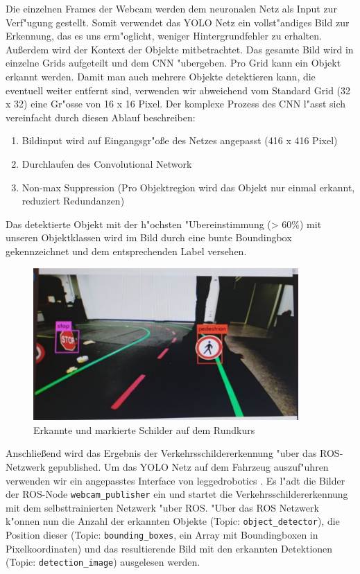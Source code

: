 Die einzelnen Frames der Webcam werden dem neuronalen Netz als Input zur Verf"ugung gestellt. Somit verwendet das YOLO Netz ein vollst"andiges Bild zur Erkennung, das es uns erm"oglicht, weniger Hintergrundfehler zu erhalten. Au\ss erdem wird der Kontext der Objekte mitbetrachtet. Das gesamte Bild wird in einzelne Grids aufgeteilt und dem CNN "ubergeben. Pro Grid kann ein Objekt erkannt werden. Damit man auch mehrere Objekte detektieren kann, die eventuell weiter entfernt sind, verwenden wir abweichend vom Standard Grid (32 x 32) eine Gr"osse von 16 x 16 Pixel. Der komplexe Prozess des CNN l"asst sich vereinfacht durch diesen Ablauf beschreiben:

\begin{enumerate}
	\item Bildinput wird auf Eingangsgr"o\ss e des Netzes angepasst (416 x 416 Pixel)
	\item Durchlaufen des Convolutional Network
	\item Non-max Suppression (Pro Objektregion wird das Objekt nur einmal erkannt, reduziert Redundanzen) 
\end{enumerate}

Das detektierte Objekt mit der h"ochsten "Ubereinstimmung (> 60\%) mit unseren Objektklassen wird im Bild durch eine bunte Boundingbox gekennzeichnet und dem entsprechenden Label versehen.

\begin{figure}[h]
	\centering
	\includegraphics[width=0.9\textwidth,trim={0.5cm 1cm 1cm 1cm},clip]{images/boundingboxes}
	\caption{Erkannte und markierte Schilder auf dem Rundkurs}
	\label{fig:boundingboxes}
\end{figure}

Anschlie\ss end wird das Ergebnis der Verkehrsschildererkennung "uber das ROS-Netzwerk gepublished. Um das YOLO Netz auf dem Fahrzeug auszuf"uhren verwenden wir ein angepasstes Interface von leggedrobotics \cite{leggedrobotics}. Es l"adt die Bilder der ROS-Node \texttt{webcam\_publisher} ein und startet die Verkehrsschildererkennung mit dem selbsttrainierten Netzwerk "uber ROS. "Uber das ROS Netzwerk k"onnen nun die Anzahl der erkannten Objekte (Topic: \texttt{object\_detector}), die Position dieser (Topic: \texttt{bounding\_boxes}, ein Array mit Boundingboxen in Pixelkoordinaten) und das resultierende Bild mit den erkannten Detektionen (Topic: \texttt{detection\_image}) ausgelesen werden.

